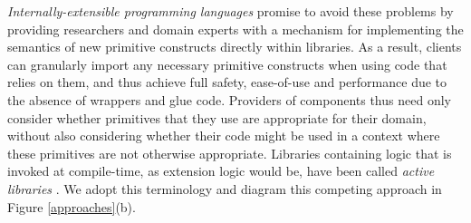 \documentclass{llncs}
\begin{document}
%
%



\emph{Internally-extensible programming languages} promise to avoid these problems by providing researchers and domain experts with a mechanism for implementing the semantics of new primitive constructs directly within libraries.
As a result, clients can granularly import any necessary primitive constructs when using code that relies on them, and thus achieve full safety, ease-of-use and performance due to the absence of wrappers and glue code. Providers of components thus need only consider whether primitives that they use are appropriate for their domain, without also considering whether their code might be used in a context where these primitives are not otherwise appropriate. Libraries containing logic that is invoked at compile-time, as extension logic would be, have been called \emph{active libraries} \cite{activelibraries}. We adopt this terminology and diagram this competing approach in Figure \ref{approaches}(b).
\end{document}

